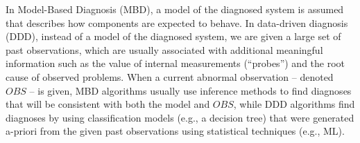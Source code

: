\documentclass[12pt]{article}
\begin{document}
In Model-Based Diagnosis (MBD), a model of the diagnosed system is assumed that describes how components are expected to behave. In data-driven diagnosis (DDD), instead of a model of the diagnosed system, we are given a large set of past observations, which are usually associated with additional meaningful information such as the value of internal measurements (``probes'') and the root cause of observed problems. 
When a current abnormal observation -- denoted $OBS$ -- is given, MBD algorithms usually use inference methods to find diagnoses that will be consistent with both the model and $OBS$, while DDD algorithms find diagnoses by using classification models (e.g., a decision tree) that were generated a-priori from the given past observations using statistical techniques (e.g., ML). 
\end{document}
